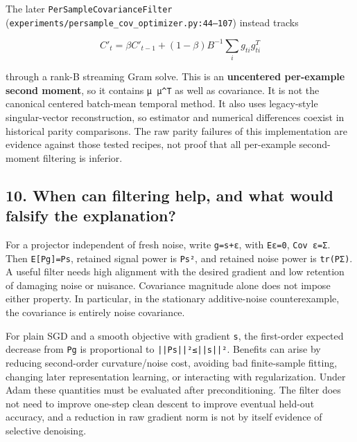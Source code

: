 \documentclass[
  british,
  10pt,
  a4paper,
]{article}
\begin{document}
The later \texttt{PerSampleCov\allowbreak{}arianceFilte\allowbreak{}r}
(\texttt{experiments/\allowbreak{}persample\_\allowbreak{}cov\_\allowbreak{}optimizer.\allowbreak{}py:\allowbreak{}44–107})
instead tracks

\[
C'_t=\beta C'_{t-1}+(1-\beta)B^{-1}\sum_i g_{ti}g_{ti}^T
\]

through a rank-B streaming Gram solve. This is an \textbf{uncentered
per-\allowbreak{}example second moment}, so it contains
\texttt{μ\ μ\^{}T} as well as covariance.\allowbreak{} It is not the
canonical centered batch-mean temporal method. It also uses
legacy-\allowbreak{}style singular-\allowbreak{}vector
reconstructi\allowbreak{}on,\allowbreak{} so estimator and numerical
differences coexist in historical parity comparisons.\allowbreak{} The
raw parity failures of this implementation are evidence against those
tested recipes, not proof that all per-\allowbreak{}example
second-\allowbreak{}moment filtering is inferior.

\subsection{10. When can filtering help, and what would falsify the
explanation?}\label{mathematical-audit--when-can-filtering-help-and-what-would-falsify-the-explanation}

For a projector independent of fresh noise, write \texttt{g=s+ε}, with
\texttt{Eε=0}, \texttt{Cov\ ε=Σ}. Then \texttt{E{[}Pg{]}=Ps}, retained
signal power is \texttt{\textbar{}\textbar{}Ps\textbar{}\textbar{}²},
and retained noise power is \texttt{tr(PΣ)}. A useful filter needs high
alignment with the desired gradient and low retention of damaging noise
or nuisance. Covariance magnitude alone does not impose either property.
In particular,\allowbreak{} in the stationary
additive-\allowbreak{}noise counterexamp\allowbreak{}le,\allowbreak{}
the covariance is entirely noise covariance.\allowbreak{}

For plain SGD and a smooth objective with gradient \texttt{s}, the
first-\allowbreak{}order expected decrease from \texttt{Pg} is
proportional to \texttt{||Ps||²≤||s|\allowbreak{}|²}. Benefits can arise
by reducing second-\allowbreak{}order curvature/\allowbreak{}noise cost,
avoiding bad finite-\allowbreak{}sample fitting, changing later
representation learning, or interacting with
regularizati\allowbreak{}on.\allowbreak{} Under Adam these quantities
must be evaluated after precondition\allowbreak{}ing.\allowbreak{} The
filter does not need to improve one-step clean descent to improve
eventual held-out accuracy, and a reduction in raw gradient norm is not
by itself evidence of selective denoising.
\end{document}
